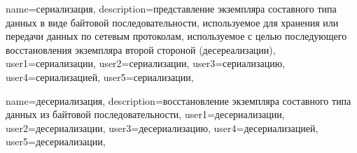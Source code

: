 {
    name=сериализация,
    description={представление экземпляра составного типа данных в виде
    байтовой последовательности, используемое для хранения или
    передачи данных по сетевым протоколам, используемое с целью последующего
    восстановления экземпляра второй стороной (десереализации)},
    user1=сериализации, %
    user2=сериализации, %
    user3=сериализацию, %
    user4=сериализацией, %
    user5=сериализации, %
}

{
    name=десериализация,
    description={восстановление экземпляра составного типа данных из
    байтовой последовательности},
    user1=десериализации, %
    user2=десериализации, %
    user3=десериализацию, %
    user4=десериализацией, %
    user5=десериализации, %
}


\newcommand{\glsgenitive}[1]{\glsuseri{#1}}   %
\newcommand{\glsdative}[1]{\glsuserii{#1}}  %
\newcommand{\glsaccusative}[1]{\glsuseriii{#1}}  %
\newcommand{\glsinstrumental}[1]{\glsuseriv{#1}} %
\newcommand{\glsprepositional}[1]{\glsuserv{#1}}  %


